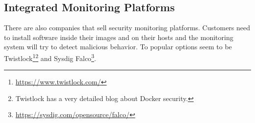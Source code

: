 \subsection{Integrated Monitoring Platforms}
There are also companies that sell security monitoring platforms. Customers need to install software inside their images and on their hosts and the monitoring system will try to detect malicious behavior. To popular options seem to be Twistlock\footnote{\url{https://www.twistlock.com/}}\footnote{Twistlock has a very detailed blog about Docker security.} and Sysdig Falco\footnote{\url{https://sysdig.com/opensource/falco/}}.
